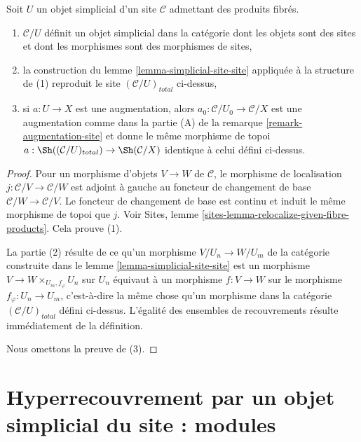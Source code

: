\begin{lemma}
\label{lemma-sr-when-fibre-products}
Soit $U$ un objet simplicial d'un site $\mathcal{C}$
admettant des produits fibrés.
\begin{enumerate}
\item $\mathcal{C}/U$ définit un objet simplicial
dans la catégorie dont les objets sont des sites et
dont les morphismes sont des morphismes de sites,
\item la construction du lemme \ref{lemma-simplicial-site-site}
appliquée à la structure de (1)
reproduit le site $(\mathcal{C}/U)_{total}$ ci-dessus,
\item si $a : U \to X$ est une augmentation, alors
$a_0 : \mathcal{C}/U_0 \to \mathcal{C}/X$ est une augmentation
comme dans la partie (A) de la remarque \ref{remark-augmentation-site} et donne le
même morphisme de topoi
$a : \Sh((\mathcal{C}/U)_{total}) \to \Sh(\mathcal{C}/X)$
identique à celui défini ci-dessus.
\end{enumerate}
\end{lemma}

\begin{proof}
Pour un morphisme d'objets $V \to W$ de $\mathcal{C}$, le morphisme de localisation
$j : \mathcal{C}/V \to \mathcal{C}/W$ est adjoint à gauche au
foncteur de changement de base $\mathcal{C}/W \to \mathcal{C}/V$.
Le foncteur de changement de base est continu et induit le même morphisme de topoi
que $j$. Voir
Sites, lemme \ref{sites-lemma-relocalize-given-fibre-products}.
Cela prouve (1).

\medskip\noindent
La partie (2) résulte de ce qu'un morphisme $V/U_n \to W/U_m$
de la catégorie construite
dans le lemme \ref{lemma-simplicial-site-site}
est un morphisme $V \to W \times_{U_m, f_\varphi} U_n$ sur $U_n$
équivaut à un morphisme $f : V \to W$
sur le morphisme $f_\varphi : U_n \to U_m$, c'est-à-dire
la même chose qu'un morphisme dans la catégorie $(\mathcal{C}/U)_{total}$
défini ci-dessus. L'égalité des ensembles de recouvrements résulte
immédiatement de la définition.

\medskip\noindent
Nous omettons la preuve de (3).
\end{proof}







\section{Hyperrecouvrement par un objet simplicial du site : modules}
\label{section-hypercovering-modules}

